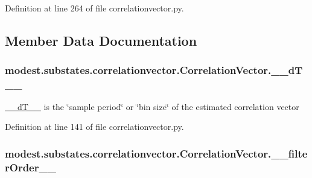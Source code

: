 Definition at line 264 of file correlationvector.\+py.



\subsection{Member Data Documentation}
\subsubsection[{\texorpdfstring{\+\_\+\+\_\+d\+T\+\_\+\+\_\+}{__dT__}}]{\setlength{\rightskip}{0pt plus 5cm}modest.\+substates.\+correlationvector.\+Correlation\+Vector.\+\_\+\+\_\+d\+T\+\_\+\+\_\+\hspace{0.3cm}{\ttfamily [private]}}\hypertarget{classmodest_1_1substates_1_1correlationvector_1_1CorrelationVector_a402e91c0356dd1a8b778916eec7bdd86}{}\label{classmodest_1_1substates_1_1correlationvector_1_1CorrelationVector_a402e91c0356dd1a8b778916eec7bdd86}


\hyperlink{classmodest_1_1substates_1_1correlationvector_1_1CorrelationVector_a402e91c0356dd1a8b778916eec7bdd86}{\+\_\+\+\_\+d\+T\+\_\+\+\_\+} is the \char`\"{}sample period\char`\"{} or \char`\"{}bin size\char`\"{} of the estimated correlation vector 



Definition at line 141 of file correlationvector.\+py.

\subsubsection[{\texorpdfstring{\+\_\+\+\_\+filter\+Order\+\_\+\+\_\+}{__filterOrder__}}]{\setlength{\rightskip}{0pt plus 5cm}modest.\+substates.\+correlationvector.\+Correlation\+Vector.\+\_\+\+\_\+filter\+Order\+\_\+\+\_\+\hspace{0.3cm}{\ttfamily [private]}}\hypertarget{classmodest_1_1substates_1_1correlationvector_1_1CorrelationVector_a6454cf8c143629a28cf684f6abbf4830}{}\label{classmodest_1_1substates_1_1correlationvector_1_1CorrelationVector_a6454cf8c143629a28cf684f6abbf4830}


